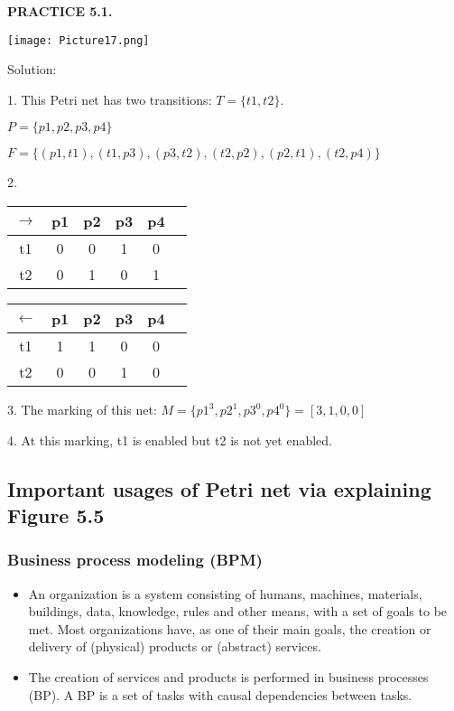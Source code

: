\documentclass[a4paper]{article}
\begin{document}
\textbf{PRACTICE 5.1.}
\begin{center}
    \texttt{[image: Picture17.png]}
\end{center}
\par
Solution:
\par\null\par
1. This Petri net has two transitions: $T = \{t1, t2\}$.\par
$P = \{p1, p2, p3, p4\}$\par
$F = \{(p1, t1), (t1, p3), (p3, t2), (t2, p2), (p2, t1), (t2, p4)\}$
\par\null\par
2.
\par
{}
\begin{center}
    \begin{tabular}{|c|c|c|c|c|c|}
    \hline
        $\rightarrow$ & p1 & p2 & p3 & p4\\
    \hline
        t1 & 0 & 0 & 1 & 0\\
    \hline
        t2 & 0 & 1 & 0 & 1\\
    \hline
    \end{tabular}
\end{center}
\par
{}
\begin{center}
    \begin{tabular}{|c|c|c|c|c|c|}
    \hline
        $\leftarrow$ & p1 & p2 & p3 & p4\\
    \hline
        t1 & 1 & 1 & 0 & 0\\
    \hline
        t2 & 0 & 0 & 1 & 0\\
    \hline
    \end{tabular}
\end{center}
\par\null\par
3. The marking of this net: $M = \{p1^{3}, p2^{1}, p3^{0}, p4^{0}\} = [3, 1, 0, 0]$
\par\null\par
4. At this marking, t1 is enabled but t2 is not yet enabled.
\par\null\par

\subsection{Important usages of Petri net via explaining Figure 5.5}
\subsubsection{Business process modeling (BPM)}
\begin{itemize}
    \item An organization is a system consisting of humans, machines, materials, buildings, data, knowledge, rules and other means, with a set of goals to be met. Most organizations have, as one of their main goals, the creation or delivery of (physical) products or (abstract) services.
    \item The creation of services and products is performed in business processes (BP). A BP is a set of tasks with causal dependencies between tasks.
\end{itemize}
\end{document}

